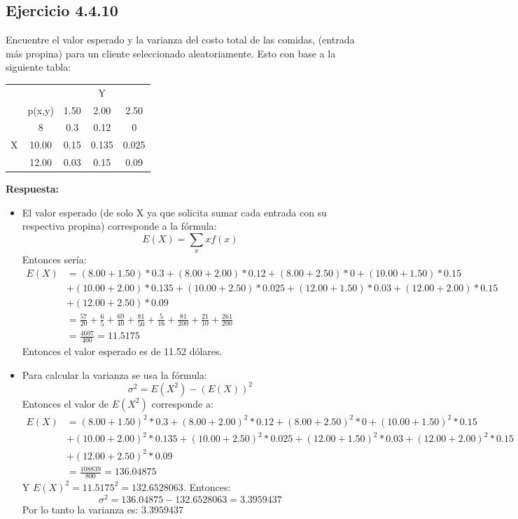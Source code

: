 \documentclass{article}\usepackage[]{graphicx}\usepackage[]{color}
\begin{document}
\subsection{Ejercicio 4.4.10}
Encuentre el valor esperado y la varianza del costo total de las comidas, (entrada más propina) para un cliente seleccionado aleatoriamente. Esto con base a la siguiente tabla:
\begin{table}[H]
\centering
\begin{tabular}{cc|ccc}
                       &        &                           & Y                          &       \\ \cline{3-5} 
                       & p(x,y) & \multicolumn{1}{c|}{1.50} & \multicolumn{1}{c|}{2.00}  & 2.50  \\ \hline
\multicolumn{1}{c|}{}  & 8      & \multicolumn{1}{c|}{0.3}  & \multicolumn{1}{c|}{0.12}  & 0     \\ \hline
\multicolumn{1}{c|}{X} & 10.00  & \multicolumn{1}{c|}{0.15} & \multicolumn{1}{c|}{0.135} & 0.025 \\ \hline
\multicolumn{1}{c|}{}  & 12.00  & \multicolumn{1}{c|}{0.03} & \multicolumn{1}{c|}{0.15}  & 0.09 
\end{tabular}
\end{table}
\textbf{Respuesta:}
\begin{itemize}

\item El valor esperado (de solo X ya que solicita sumar cada entrada con su respectiva propina) corresponde a la fórmula: 
\[E(X) = \sum_{x}xf(x)\]
Entonces sería:
\begin{align*}
E(X) &= (8.00+1.50)*0.3+(8.00+2.00)*0.12+(8.00+2.50)*0+(10.00+1.50)*0.15\\&+(10.00+2.00)*0.135+(10.00+2.50)*0.025+(12.00+1.50)*0.03+(12.00+2.00)*0.15\\&+(12.00+2.50)*0.09\\
&= \frac{57}{20}+\frac{6}{5}+\frac{69}{40}+\frac{81}{50}+\frac{5}{16}+\frac{81}{200}+\frac{21}{10}+\frac{261}{200}\\
&= \frac{4607}{400} = 11.5175
\end{align*}
Entonces el valor esperado es de 11.52 dólares.

\item Para calcular la varianza se usa la fórmula:
\[\sigma^{2} = E(X^{2})-(E(X))^{2}\]
Entonces el valor de $E(X^2)$ corresponde a:
\begin{align*}
E(X) &= (8.00+1.50)^{2}*0.3+(8.00+2.00)^{2}*0.12+(8.00+2.50)^{2}*0+(10.00+1.50)^{2}*0.15\\&+(10.00+2.00)^{2}*0.135+(10.00+2.50)^{2}*0.025+(12.00+1.50)^{2}*0.03+(12.00+2.00)^{2}*0.15\\&+(12.00+2.50)^{2}*0.09\\
&= \frac{108839}{800} = 136.04875
\end{align*}
Y $E(X)^{2} = 11.5175^{2} = 132.6528063$. Entonces:
\[\sigma^{2} = 136.04875- 132.6528063= 3.3959437\]
Por lo tanto la varianza es: $3.3959437$
\end{itemize}


\end{document}
